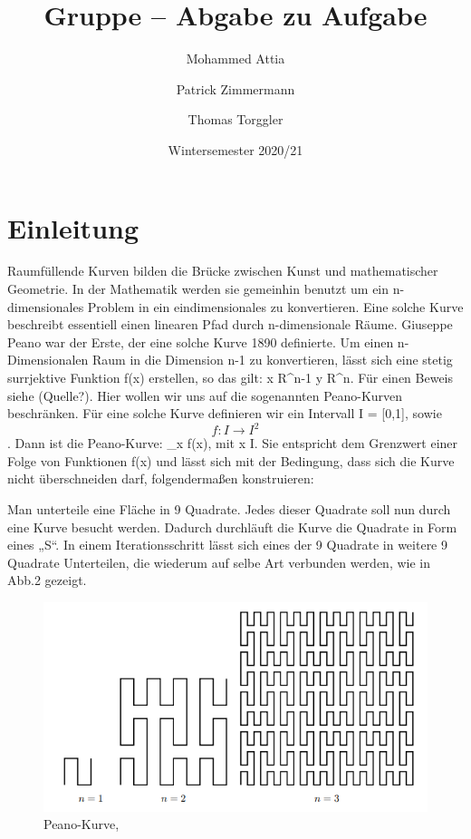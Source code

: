 \documentclass[course=asp]{aspdoc}
\author{Mohammed Attia \and Patrick Zimmermann \and Thomas Torggler}
\date{Wintersemester 2020/21} %
\title{Gruppe \theGroup{} -- Abgabe zu Aufgabe \theNumber}
\begin{document}
\maketitle

\section{Einleitung}

Raumfüllende Kurven bilden die Brücke zwischen Kunst und mathematischer Geometrie. In der Mathematik werden sie gemeinhin benutzt um ein n-dimensionales Problem in ein  eindimensionales zu konvertieren. Eine solche Kurve beschreibt essentiell einen linearen Pfad durch n-dimensionale Räume. Giuseppe Peano war der Erste, der eine solche Kurve 1890 definierte.
Um einen n-Dimensionalen Raum in die Dimension n-1 zu konvertieren, lässt sich eine stetig surrjektive Funktion f(x) erstellen, so das gilt: \forall x \in R^n-1 \quad \exits y \in R^n. Für einen Beweis siehe (Quelle?). Hier wollen wir uns auf die sogenannten Peano-Kurven beschränken. Für eine solche Kurve definieren wir ein Intervall I = [0,1], sowie \[ f: I \rightarrow I^2 \]. Dann ist die Peano-Kurve: \lim\limits_{x \to \infty}f(x), mit x \in I. Sie { entspricht dem Grenzwert einer Folge von Funktionen f(x) und } lässt sich mit der Bedingung, dass sich die Kurve nicht überschneiden darf, folgendermaßen konstruieren:

Man unterteile eine Fläche in 9 Quadrate. Jedes dieser Quadrate soll nun durch eine Kurve besucht werden. Dadurch durchläuft die Kurve die Quadrate in Form eines „S“.
In einem Iterationsschritt lässt sich eines der 9 Quadrate in weitere 9 Quadrate Unterteilen, die wiederum auf selbe Art verbunden werden, wie in Abb.2 gezeigt.

\begin{figure}[hb]
\centering
\includegraphics{PeanoBsp.png}
\caption{Peano-Kurve, \cite{aufgabenstellung}}\label{Abb:Peano}				%
\end{figure}
\end{document}
